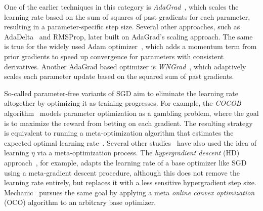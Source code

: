 \documentclass[runningheads]{llncs}
\begin{document}
One of the earlier techniques in this category is \textit{AdaGrad}~\cite{duchiAdaptiveSubgradientMethods2011}, which scales the learning rate based on the sum of squares of past gradients for each parameter, resulting in a parameter-specific step size.
Several other approaches, such as AdaDelta~\cite{zeilerADADELTAAdaptiveLearning2012a} and RMSProp, later built on AdaGrad's scaling approach.
The same is true for the widely used Adam optimizer~\cite{kingmaAdamMethodStochastic2017b}, which adds a momentum term from prior gradients to speed up convergence for parameters with consistent derivatives.
Another AdaGrad based optimizer is \textit{WNGrad}~\cite{wuWNGradLearnLearning2020}, which adaptively scales each parameter update based on the squared sum of past gradients.

So-called parameter-free variants of SGD aim to eliminate the learning rate altogether by optimizing it as training progresses.
For example, the \textit{COCOB} algorithm~\cite{orabonaTrainingDeepNetworks2017} models parameter optimization as a gambling problem, where the goal is to maximize the reward from betting on each gradient.
The resulting strategy is equivalent to running a meta-optimization algorithm that estimates the expected optimal learning rate~\cite{orabonaTrainingDeepNetworks2017}.
Several other studies~\cite{vanervenMetaGradMultipleLearning2016a,baydinOnlineLearningRate2018,cutkoskyMechanicLearningRate2023} have also used the idea of learning $\eta$ via a meta-optimization process.
The \textit{hypergradient descent} (HD) approach~\cite{baydinOnlineLearningRate2018}, for example, adapts the learning rate of a base optimizer like SGD using a meta-gradient descent procedure, although this does not remove the learning rate entirely, but replaces it with a less sensitive hypergradient step size.
Mechanic~\cite{cutkoskyMechanicLearningRate2023} pursues the same goal by applying a meta \textit{online convex optimization} (OCO) algorithm to an arbitrary base optimizer.
\end{document}
